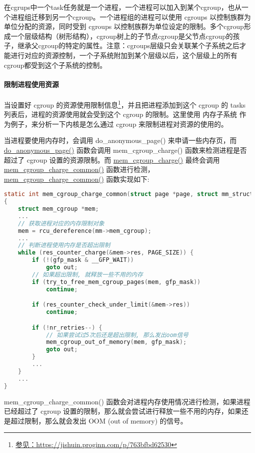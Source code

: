 \documentclass[../../../interview-questions.tex]{subfiles}
\begin{document}
在cgrups中一个task任务就是一个进程，一个进程可以加入到某个cgroup，也从一个进程组迁移到另一个cgroup。一个进程组的进程可以使用 cgroups 以控制族群为单位分配的资源，同时受到 cgroups 以控制族群为单位设定的限制。多个cgroup形成一个层级结构（树形结构），cgroup树上的子节点cgroup是父节点cgroup的孩子，继承父cgroup的特定的属性。注意：cgroups层级只会关联某个子系统之后才能进行对应的资源控制，一个子系统附加到某个层级以后，这个层级上的所有cgroup都受到这个子系统的控制。

\paragraph{限制进程使用资源}

当设置好 cgroup 的资源使用限制信息\footnote{\url{参见：https://jishuin.proginn.com/p/763bfbd62530}}，并且把进程添加到这个 cgroup 的 tasks 列表后，进程的资源使用就会受到这个 cgroup 的限制。这里使用 内存子系统 作为例子，来分析一下内核是怎么通过 cgroup 来限制进程对资源的使用的。

当进程要使用内存时，会调用 do\_anonymous\_page() 来申请一些内存页，而 \url{do\_anonymous\_page()} 函数会调用 mem\_cgroup\_charge() 函数来检测进程是否超过了 cgroup 设置的资源限制。而 \url{mem\_cgroup\_charge()} 最终会调用 \url{mem\_cgroup\_charge\_common()} 函数进行检测，\url{mem\_cgroup\_charge\_common()} 函数实现如下:

\begin{lstlisting}[language=C]
static int mem_cgroup_charge_common(struct page *page, struct mm_struct *mm, gfp_t gfp_mask, enum charge_type ctype)
{
    struct mem_cgroup *mem;
    ...
    // 获取进程对应的内存限制对象
    mem = rcu_dereference(mm->mem_cgroup); 
    ...
    // 判断进程使用内存是否超出限制
    while (res_counter_charge(&mem->res, PAGE_SIZE)) { 
        if (!(gfp_mask & __GFP_WAIT))
            goto out;
        // 如果超出限制, 就释放一些不用的内存
        if (try_to_free_mem_cgroup_pages(mem, gfp_mask)) 
            continue;

        if (res_counter_check_under_limit(&mem->res))
            continue;

        if (!nr_retries--) {
            // 如果尝试过5次后还是超出限制, 那么发出oom信号
            mem_cgroup_out_of_memory(mem, gfp_mask); 
            goto out;
        }
        ...
    }
    ...
}
\end{lstlisting}

mem\_cgroup\_charge\_common() 函数会对进程内存使用情况进行检测，如果进程已经超过了 cgroup 设置的限制，那么就会尝试进行释放一些不用的内存，如果还是超过限制，那么就会发出 OOM (out of memory) 的信号。
\end{document}
